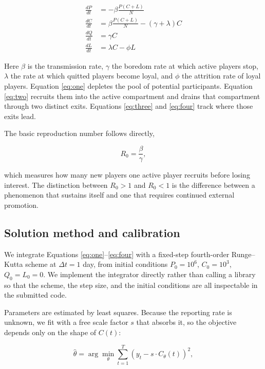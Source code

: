 \documentclass[12pt]{article}
\begin{document}
\begin{align}
  \frac{dP}{dt} &= -\beta \frac{P(C+L)}{N} \label{eq:one} \\
  \frac{dC}{dt} &= \beta \frac{P(C+L)}{N} - (\gamma + \lambda) C \label{eq:two} \\
  \frac{dQ}{dt} &= \gamma C \label{eq:three} \\
  \frac{dL}{dt} &= \lambda C - \phi L \label{eq:four}
\end{align}

Here $\beta$ is the transmission rate, $\gamma$ the boredom rate at which active
players stop, $\lambda$ the rate at which quitted players become loyal, and
$\phi$ the attrition rate of loyal players. Equation \eqref{eq:one} depletes the
pool of potential participants. Equation \eqref{eq:two} recruits them into the
active compartment and drains that compartment through two distinct exits.
Equations \eqref{eq:three} and \eqref{eq:four} track where those exits lead.

The basic reproduction number follows directly,

\begin{equation}
  R_0 = \frac{\beta}{\gamma},
  \label{eq:r0}
\end{equation}

which measures how many new players one active player recruits before losing
interest. The distinction between $R_0 > 1$ and $R_0 < 1$ is the difference
between a phenomenon that sustains itself and one that requires continued
external promotion.

\subsection{Solution method and calibration}

We integrate Equations \eqref{eq:one}--\eqref{eq:four} with a fixed-step
fourth-order Runge--Kutta scheme at $\Delta t = 1$ day, from initial conditions
$P_0 = 10^{6}$, $C_0 = 10^{3}$, $Q_0 = L_0 = 0$. We implement the integrator
directly rather than calling a library so that the scheme, the step size, and
the initial conditions are all inspectable in the submitted code.

Parameters are estimated by least squares. Because the reporting rate is
unknown, we fit with a free scale factor $s$ that absorbs it, so the objective
depends only on the shape of $C(t)$:

\begin{equation}
  \hat{\theta} = \arg\min_{\theta} \sum_{t=1}^{T}
    \left( y_t - s \cdot C_\theta(t) \right)^{2} ,
  \label{eq:calib}
\end{equation}
\end{document}
